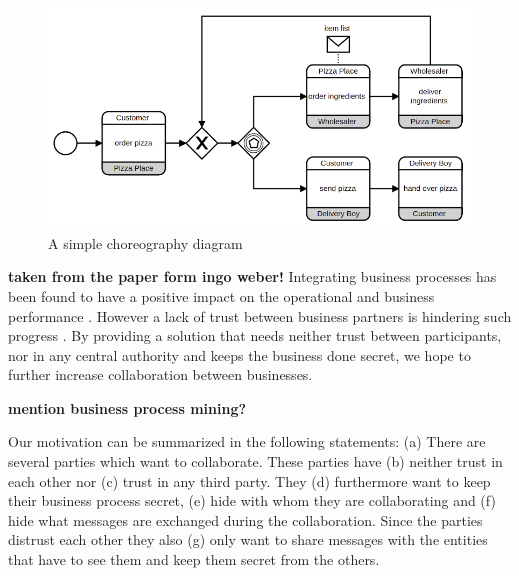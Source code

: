 \documentclass[runningheads]{llncs}
\newcommand{\comment}[1]{}
\newcommand{\ber}[1]{(\lowercase\expandafter{#1\relax})} %
\begin{document}
\begin{figure}
    \centering
    \includegraphics[scale=0.6]{bpmn.png}
    \caption{A simple choreography diagram}
    \label{fig:simple_bpmn}
\end{figure}

\textbf{taken from the paper form ingo weber!}
Integrating business processes has been found to have a positive impact on the operational and business performance \cite{flynn2010impact,narayanan2011antecedents}. However a lack of trust between business partners is hindering such progress \cite{panayides2009impact}. By providing a solution that needs neither trust between participants, nor in any central authority and keeps the business done secret, we hope to further increase collaboration between businesses. 

\textbf{mention business process mining?} \cite{van2007business}



Our motivation can be summarized in the following statements: \ber{a} There are several parties which want to collaborate. These parties have \ber{b} neither trust in each other nor \ber{c} trust in any third party. They \ber{d} furthermore want to keep their business process secret, \ber{e} hide with whom they are collaborating and \ber{f} hide what messages are exchanged during the collaboration. Since the parties distrust each other they also \ber{g} only want to share messages with the entities that have to see them and keep them secret from the others.

\comment{
\begin{itemize}
    \item there are several parties who want to collaborate 
    \item parties have no trust in each other 
    \item parties have no trust in a third party
    \item parties have strong interest in keeping things secret
\end{itemize}
}
\end{document}

